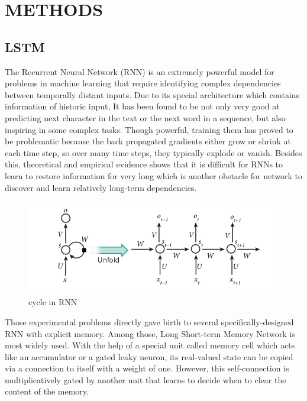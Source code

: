 \documentclass[10pt, conference, compsocconf]{IEEEtran}
\begin{document}
\vspace{0.5cm}

\section{METHODS}
\subsection{LSTM}
The Recurrent Neural Network (RNN) is an extremely powerful model for problems in machine learning that require identifying complex dependencies 
between temporally distant inputs. Due to its special architecture which contains information of historic input, It has been found to be not 
only very good at predicting next character in the text or the next word in a sequence, but also inspiring in some complex tasks. Though 
powerful, training them has proved to be problematic because the back propagated gradients either grow or shrink at each time step, so over 
many time steps, they typically explode or vanish. Besides this, theoretical and empirical evidence shows that it is difficult for RNNs to 
learn to restore information for very long which is another obstacle for network to discover and learn relatively long-term dependencies.\\

\begin{figure}[ht]
	\centering
	\includegraphics[scale=0.5]{1.png}
	\caption{cycle in RNN} \label{fig 1}
\end{figure}

Those experimental problems directly gave birth to several specifically-designed RNN with explicit memory. Among those, Long Short-term Memory 
Network is most widely used. With the help of a special unit called memory cell which acts like an accumulator or a gated leaky neuron, its 
real-valued state can be copied via a connection to itself with a weight of one. However, this self-connection is multiplicatively gated by 
another unit that learns to decide when to clear the content of the memory.\\
\end{document}
